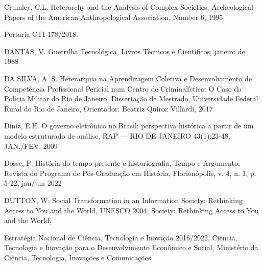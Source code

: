 \begin{flushleft}
[CRUMLEY, 1995] Crumley, C.L. Heterarchy and the Analysis of Complex Societies, Archeological Papers of the American Anthropological Association, Number 6, 1995
\end{flushleft}


\begin{flushleft}
[CTI, 2018] Portaria CTI 178/2018.
\end{flushleft}


\begin{flushleft}
[DANTAS, 1988] DANTAS, V. Guerrilha Tecnológica, Livros Técnicos e Científicos, janeiro de 1988
\end{flushleft}


\begin{flushleft}
[DA SILVA, 2017] DA SILVA, A. S. Heterarquia na Aprendizagem Coletiva e Desenvolvimento de Competência Profissional Pericial num Centro de Criminalística: O Caso da Polícia Militar do Rio de Janeiro, Dissertação de Mestrado, Universidade Federal Rural do Rio de Janeiro, Orientador: Beatriz Quiroz Villardi, 2017
\end{flushleft}


\begin{flushleft}
[DINIZ, 2009] Diniz, E.H. O governo eletrônico no Brasil: perspectiva histórica a partir de um modelo estruturado de análise, RAP — RIO DE JANEIRO 43(1):23-48, JAN./FEV. 2009
\end{flushleft}


\begin{flushleft}
[DOSSE, 2012] Dosse, F. História do tempo presente e historiografia, Tempo e Argumento, Revista do Programa de Pós-Graduação em História, Florionópolis, v. 4, n. 1, p. 5-22, jan/jun 2022
\end{flushleft}


\begin{flushleft}
[DUTTON, 2004] DUTTON, W. Social Transformation in an Information Society: Rethinking Access to You and the World, UNESCO 2004, Society: Rethinking Access to You and the World, 
\end{flushleft}


\begin{flushleft}
[ENCTI, 2016] Estratégia Nacional de Ciência, Tecnologia e Inovação 2016/2022, Ciência, Tecnologia e Inovação para o Desenvolvimento Econômico e Social, Ministério da Ciência, Tecnologia, Inovações e Comunicações
\end{flushleft}


